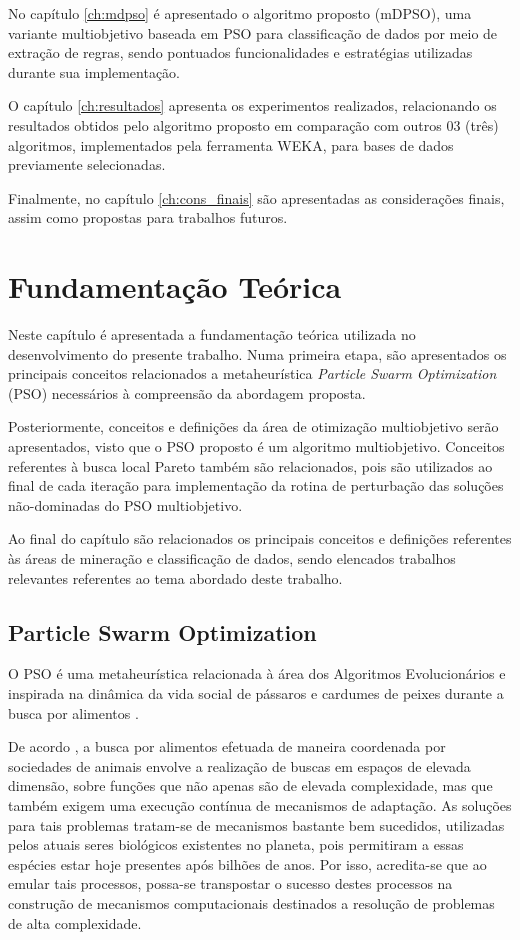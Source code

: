 \documentclass[
	12pt,				%
	openany,			%
	oneside,	
	a4paper,			%
	brazil,				%
	]{unimontes-ppgmsc-abntex2}
\begin{document}
No capítulo \ref{ch:mdpso} é apresentado o algoritmo proposto (mDPSO), uma variante multiobjetivo baseada em PSO para classificação de dados por meio de extração de regras, sendo pontuados funcionalidades e estratégias utilizadas durante sua implementação.

O capítulo \ref{ch:resultados} apresenta os experimentos realizados, relacionando os resultados obtidos pelo algoritmo proposto em comparação com outros 03 (três) algoritmos, implementados pela ferramenta WEKA, para bases de dados previamente selecionadas.

Finalmente, no capítulo \ref{ch:cons_finais} são apresentadas as considerações finais, assim como propostas para trabalhos futuros.


\chapter{Fundamentação Teórica}
\label{ch:ref_teorico}

Neste capítulo é apresentada a fundamentação teórica utilizada no desenvolvimento do presente trabalho. Numa primeira etapa, são apresentados os principais conceitos relacionados a metaheurística {\em Particle Swarm Optimization} (PSO) necessários à compreensão da abordagem proposta. 

Posteriormente, conceitos e definições da área de otimização multiobjetivo serão apresentados, visto que o PSO proposto é um algoritmo multiobjetivo. Conceitos referentes à busca local Pareto também são relacionados, pois são utilizados ao final de cada iteração para implementação da rotina de perturbação das soluções não-dominadas do PSO multiobjetivo. 

Ao final do capítulo são relacionados os principais conceitos e definições referentes às áreas de mineração e classificação de dados, sendo elencados trabalhos relevantes referentes ao tema abordado deste trabalho.


\section{Particle Swarm Optimization}
\label{ch:pso}

O PSO é uma metaheurística relacionada à área dos Algoritmos Evolucionários e inspirada na dinâmica da vida social de pássaros e cardumes de peixes durante a busca por alimentos \cite{Kennedy_1995}.

De acordo , a busca por alimentos efetuada de maneira coordenada por sociedades de animais envolve a realização de buscas em espaços de elevada dimensão, sobre funções que não apenas são de elevada complexidade, mas que também exigem uma execução contínua de mecanismos de adaptação. As soluções para tais problemas tratam-se de mecanismos bastante bem sucedidos, utilizadas pelos atuais seres biológicos existentes no planeta, pois permitiram a essas espécies estar hoje presentes após bilhões de anos. Por isso, acredita-se que ao emular tais processos, possa-se transpostar o sucesso destes processos na construção de mecanismos computacionais destinados a resolução de problemas de alta complexidade.
 
\end{document}

